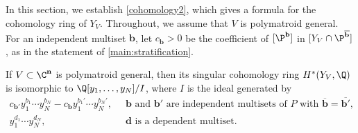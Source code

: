 \subsection{}\label{sec:topresults}
In this section, we establish \cref{cohomology2}, which gives a formula for the cohomology ring of $Y_V$.
Throughout, we assume that $V$ is polymatroid general.
For an independent multiset $\mathbf b$, let $c_{\mathbf b} > 0$ be the coefficient of $[\P^{\mathbf b}]$ in   $[Y_V \cap \P^{\overline{\mathbf b}}]$, as in the statement of \cref{main:stratification}.
\begin{prop}\label{cohomology1}
  If $V \subset \C^{\mathbf n}$ is polymatroid general, then its singular cohomology ring $H^*(Y_V, \Q)$ is isomorphic to $\Q[y_1, \ldots, y_N] / I$, where $I$ is the ideal generated by 
  \begin{align*}
    \textstyle    c_{\mathbf b'} y_1^{b_1} \cdots y_N^{b_N} - c_{\mathbf b} y_1^{b_1'} \cdots y_N^{b_N'}, &\;\; \text{$\mathbf b$ and $\mathbf b'$ are independent multisets of $P$ with $\overline{\mathbf b} = \overline{\mathbf b'}$, } \\
    y_1^{d_1}\cdots y_N^{d_N}, &\;\; \text{$\mathbf d$ is a dependent multiset.}
  \end{align*}
\end{prop}
